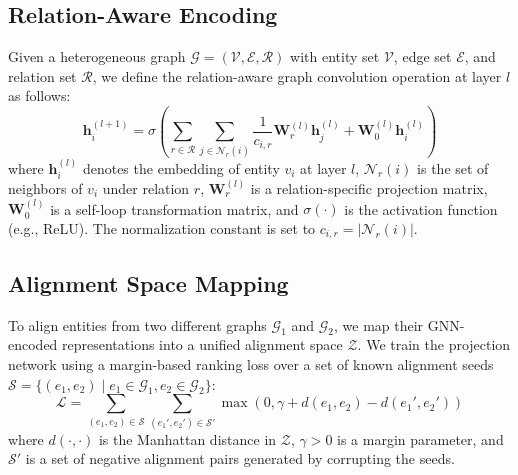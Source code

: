 \subsection{Relation-Aware Encoding}
Given a heterogeneous graph $\mathcal{G} = (\mathcal{V}, \mathcal{E}, \mathcal{R})$ with entity set $\mathcal{V}$, edge set $\mathcal{E}$, and relation set $\mathcal{R}$, we define the relation-aware graph convolution operation at layer $l$ as follows:
\begin{equation}
  \mathbf{h}_{i}^{(l+1)} = \sigma \left( \sum_{r \in \mathcal{R}} \sum_{j \in \mathcal{N}_r(i)} \frac{1}{c_{i,r}} \mathbf{W}_r^{(l)} \mathbf{h}_{j}^{(l)} + \mathbf{W}_0^{(l)} \mathbf{h}_{i}^{(l)} \right)
  \label{eq:gnn_update}
\end{equation}
where $\mathbf{h}_{i}^{(l)}$ denotes the embedding of entity $v_i$ at layer $l$, $\mathcal{N}_r(i)$ is the set of neighbors of $v_i$ under relation $r$, $\mathbf{W}_r^{(l)}$ is a relation-specific projection matrix, $\mathbf{W}_0^{(l)}$ is a self-loop transformation matrix, and $\sigma(\cdot)$ is the activation function (e.g., ReLU). The normalization constant is set to $c_{i,r} = |\mathcal{N}_r(i)|$.

\subsection{Alignment Space Mapping}
To align entities from two different graphs $\mathcal{G}_1$ and $\mathcal{G}_2$, we map their GNN-encoded representations into a unified alignment space $\mathcal{Z}$. We train the projection network using a margin-based ranking loss over a set of known alignment seeds $\mathcal{S} = \{(e_1, e_2) \mid e_1 \in \mathcal{G}_1, e_2 \in \mathcal{G}_2\}$:
\begin{equation}
  \mathcal{L} = \sum_{(e_1, e_2) \in \mathcal{S}} \sum_{(e_1', e_2') \in \mathcal{S}'} \max \left( 0, \gamma + d(e_1, e_2) - d(e_1', e_2') \right)
  \label{eq:loss}
\end{equation}
where $d(\cdot, \cdot)$ is the Manhattan distance in $\mathcal{Z}$, $\gamma > 0$ is a margin parameter, and $\mathcal{S}'$ is a set of negative alignment pairs generated by corrupting the seeds.
